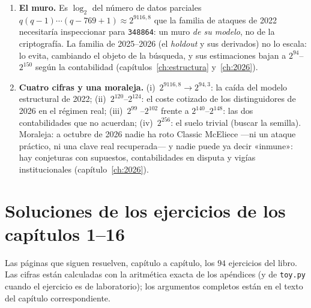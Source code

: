 \begin{enumerate}[leftmargin=1.9em,itemsep=5pt]
  \item \textbf{El muro.} Es $\log_2$ del número de datos
        parciales $q(q-1)\cdots(q-769+1)\approx2^{9116{,}8}$ que
        la familia de ataques de 2022 necesitaría inspeccionar
        para \texttt{348864}: un muro \emph{de su modelo}, no de
        la criptografía. La familia de 2025--2026 (el
        \emph{holdout} y sus derivados) no lo escala: lo evita,
        cambiando el objeto de la búsqueda, y sus estimaciones
        bajan a $2^{94}$--$2^{150}$ según la contabilidad
        (capítulos~\ref{ch:estructura} y~\ref{ch:2026}).

  \item \textbf{Cuatro cifras y una moraleja.} (i)~$2^{9116{,}8}\to
        2^{94{,}3}$: la caída del modelo estructural de 2022;
        (ii)~$2^{120}$--$2^{124}$: el coste cotizado de los
        distinguidores de 2026 en el régimen real; (iii)~$2^{99}$
        --$2^{102}$ frente a $2^{140}$--$2^{148}$: las dos
        contabilidades que no acuerdan; (iv)~$2^{256}$: el suelo
        trivial (buscar la semilla). Moraleja: a octubre de 2026
        nadie ha roto Classic McEliece ---ni un ataque práctico,
        ni una clave real recuperada--- y nadie puede ya decir
        «inmune»: hay conjeturas con supuestos, contabilidades en
        disputa y vigías institucionales (capítulo~\ref{ch:2026}).
\end{enumerate}

\section{Soluciones de los ejercicios de los capítulos 1--16}
\label{sec:sol-ejercicios}

Las páginas que siguen resuelven, capítulo a capítulo, los $94$
ejercicios del libro. Las cifras están calculadas con la aritmética
exacta de los apéndices (y de \texttt{toy.py} cuando el ejercicio es
de laboratorio); los argumentos completos están en el texto del
capítulo correspondiente.
